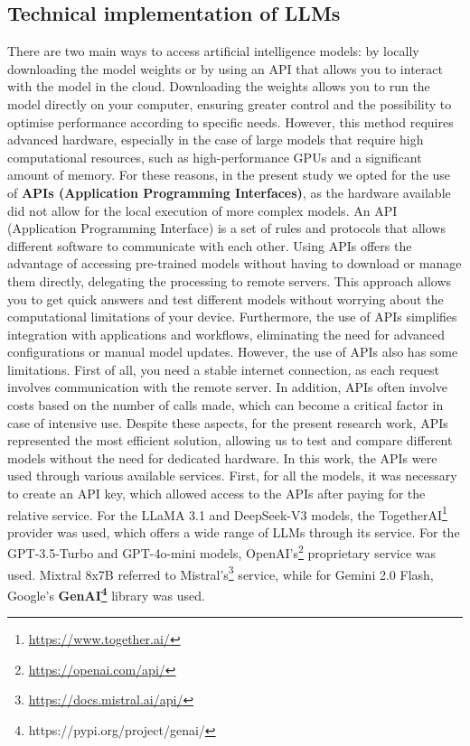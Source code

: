 \subsection{Technical implementation of LLMs}
There are two main ways to access artificial intelligence models: by locally downloading the model weights or by using an API that allows you to interact with the model in the cloud. Downloading the weights allows you to run the model directly on your computer, ensuring greater control and the possibility to optimise performance according to specific needs. However, this method requires advanced hardware, especially in the case of large models that require high computational resources, such as high-performance GPUs and a significant amount of memory.
For these reasons, in the present study we opted for the use of \textbf{APIs (Application Programming Interfaces)}, as the hardware available did not allow for the local execution of more complex models. An API (Application Programming Interface) is a set of rules and protocols that allows different software to communicate with each other. Using APIs offers the advantage of accessing pre-trained models without having to download or manage them directly, delegating the processing to remote servers. This approach allows you to get quick answers and test different models without worrying about the computational limitations of your device. Furthermore, the use of APIs simplifies integration with applications and workflows, eliminating the need for advanced configurations or manual model updates.
However, the use of APIs also has some limitations. First of all, you need a stable internet connection, as each request involves communication with the remote server. In addition, APIs often involve costs based on the number of calls made, which can become a critical factor in case of intensive use. Despite these aspects, for the present research work, APIs represented the most efficient solution, allowing us to test and compare different models without the need for dedicated hardware.
In this work, the APIs were used through various available services. First, for all the models, it was necessary to create an API key, which allowed access to the APIs after paying for the relative service.
For the LLaMA 3.1 and DeepSeek-V3 models, the TogetherAI\footnote{\url{https://www.together.ai/}} provider was used, which offers a wide range of LLMs through its service.
For the GPT-3.5-Turbo and GPT-4o-mini models, OpenAI's\footnote{\url{https://openai.com/api/}} proprietary service was used.
Mixtral 8x7B referred to Mistral's\footnote{\url{https://docs.mistral.ai/api/}} service,  while for Gemini 2.0 Flash, Google's \textbf{GenAI\footnote{https://pypi.org/project/genai/}} library was used.
\\

